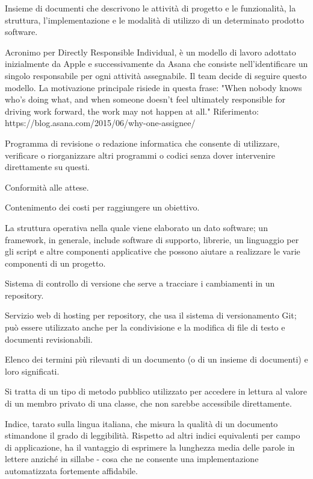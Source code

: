 \item[Documentazione] Insieme di documenti che descrivono le attività di progetto e le funzionalità, la struttura, l'implementazione e le modalità di utilizzo di un determinato prodotto software. 
\item[DRI] Acronimo per Directly Responsible Individual, è un modello di lavoro adottato inizialmente da Apple e successivamente da Asana che consiste nell'identificare un singolo responsabile per ogni attività assegnabile. Il team decide di seguire questo modello. La motivazione principale risiede in questa frase: "When nobody knows who’s doing what, and when someone doesn’t feel ultimately responsible for driving work forward, the work may not happen at all." Riferimento: https://blog.asana.com/2015/06/why-one-assignee/ 
\item[Editor] Programma di revisione o redazione informatica che consente di utilizzare, verificare o riorganizzare altri programmi o codici senza dover intervenire direttamente su questi.
\item[Efficacia] Conformità alle attese.
\item[Efficienza] Contenimento dei costi per raggiungere un obiettivo.
\item[Framework]  La struttura operativa nella quale viene elaborato un dato software; un framework, in generale, include software di supporto, librerie, un linguaggio per gli script e altre componenti applicative che possono aiutare a realizzare le varie componenti di un progetto.
\item[Git] Sistema di controllo di versione che serve a tracciare i cambiamenti in un repository.
\item[GitHub] Servizio web di hosting per repository, che usa il sistema di versionamento Git; può essere utilizzato anche per la condivisione e la modifica di file di testo e documenti revisionabili.
\item[Glossario] Elenco dei termini più rilevanti di un documento (o di un insieme di documenti) e loro significati.
\item[Getter] Si tratta di un tipo di metodo pubblico utilizzato per accedere in lettura al valore di un membro privato di una classe, che non sarebbe accessibile direttamente.
\item[Gulpease, indice di] Indice, tarato sulla lingua italiana, che misura la qualità di un documento stimandone il grado di leggibilità. Rispetto ad altri indici equivalenti per campo di applicazione, ha il vantaggio di esprimere la lunghezza media delle parole in lettere anziché in sillabe - cosa che ne consente una implementazione automatizzata fortemente affidabile. 
